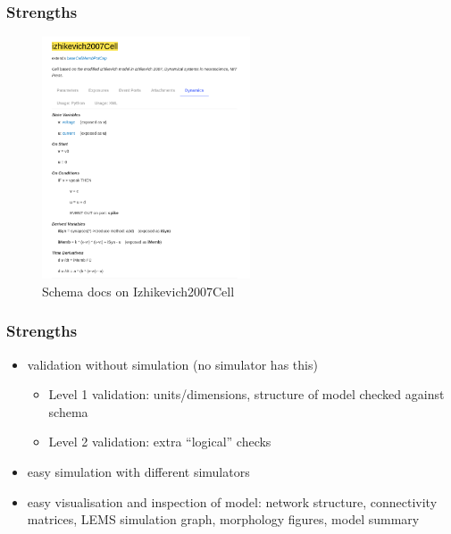 \begin{frame}[t]
  \frametitle{Strengths}
  \begin{figure}[h]
    \centering
    \includegraphics[width=0.55\textwidth]{99_images/izhikevich-schema-docs}
    \caption{Schema docs on Izhikevich2007Cell}%
    \label{fig:99_images-izhikevich-schema-docs}
  \end{figure}
\end{frame}
\begin{frame}[t]
  \frametitle{Strengths}
  \begin{itemize}
      \item \alert{validation} without simulation (no simulator has this)
        \begin{itemize}
          \item Level 1 validation: units/dimensions, structure of model checked against schema
          \item Level 2 validation: extra \enquote{logical} checks
        \end{itemize}
        \pause{}
      \item easy \alert{simulation} with different simulators
      \item easy \alert{visualisation} and inspection of model: network structure, connectivity matrices, LEMS simulation graph, morphology figures, model summary
  \end{itemize}
\end{frame}
